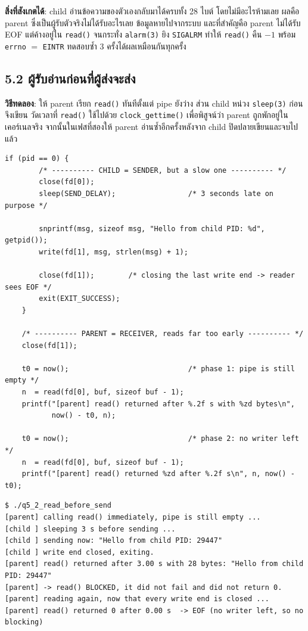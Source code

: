 \documentclass[a4paper,12pt]{article}
\newcommand{\code}[1]{\texttt{#1}}
\begin{document}
\textbf{สิ่งที่สังเกตได้}: child อ่านข้อความของตัวเองกลับมาได้ครบทั้ง 28 ไบต์ โดยไม่มีอะไรห้ามเลย ผลคือ parent ซึ่งเป็นผู้รับตัวจริงไม่ได้รับอะไรเลย ข้อมูลหายไปจากระบบ และที่สำคัญคือ parent ไม่ได้รับ EOF แต่ค้างอยู่ใน \code{read()} จนกระทั่ง \code{alarm(3)} ยิง \code{SIGALRM} ทำให้ \code{read()} คืน $-1$ พร้อม \code{errno} $=$ \code{EINTR} ทดสอบซ้ำ 3 ครั้งได้ผลเหมือนกันทุกครั้ง

\newpage

\subsection{5.2 ผู้รับอ่านก่อนที่ผู้ส่งจะส่ง}

\textbf{วิธีทดลอง}: ให้ parent เรียก \code{read()} ทันทีตั้งแต่ pipe ยังว่าง ส่วน child หน่วง \code{sleep(3)} ก่อนจึงเขียน วัดเวลาที่ \code{read()} ใช้ไปด้วย \code{clock\_gettime()} เพื่อพิสูจน์ว่า parent ถูกพักอยู่ในเคอร์เนลจริง จากนั้นในเฟสที่สองให้ parent อ่านซ้ำอีกครั้งหลังจาก child ปิดปลายเขียนและจบไปแล้ว

\begin{lstlisting}[caption={ส่วนของโค้ดที่แก้ไขในข้อ 5.2},label={lst:q5_2}]
    if (pid == 0) {
        /* ---------- CHILD = SENDER, but a slow one ---------- */
        close(fd[0]);
        sleep(SEND_DELAY);                 /* 3 seconds late on purpose */

        snprintf(msg, sizeof msg, "Hello from child PID: %d", getpid());
        write(fd[1], msg, strlen(msg) + 1);

        close(fd[1]);        /* closing the last write end -> reader sees EOF */
        exit(EXIT_SUCCESS);
    }

    /* ---------- PARENT = RECEIVER, reads far too early ---------- */
    close(fd[1]);

    t0 = now();                            /* phase 1: pipe is still empty */
    n  = read(fd[0], buf, sizeof buf - 1);
    printf("[parent] read() returned after %.2f s with %zd bytes\n",
           now() - t0, n);

    t0 = now();                            /* phase 2: no writer left */
    n  = read(fd[0], buf, sizeof buf - 1);
    printf("[parent] read() returned %zd after %.2f s\n", n, now() - t0);
\end{lstlisting}

\begin{lstlisting}[style=terminal,caption={ผลลัพธ์ของข้อ 5.2}]
$ ./q5_2_read_before_send
[parent] calling read() immediately, pipe is still empty ...
[child ] sleeping 3 s before sending ...
[child ] sending now: "Hello from child PID: 29447"
[child ] write end closed, exiting.
[parent] read() returned after 3.00 s with 28 bytes: "Hello from child PID: 29447"
[parent] -> read() BLOCKED, it did not fail and did not return 0.
[parent] reading again, now that every write end is closed ...
[parent] read() returned 0 after 0.00 s  -> EOF (no writer left, so no blocking)
\end{lstlisting}
\end{document}
